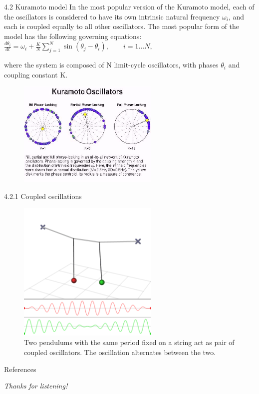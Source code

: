 \documentclass[
  notheorems,
  aspectratio=54,
]{beamer}
\begin{document}
\begin{frame}{4.2 Kuramoto model}
  In the most popular version of the Kuramoto model, each of the oscillators is considered to have its own intrinsic natural frequency
  $\omega _{i}$, and each is coupled equally to all other oscillators.
  The most popular form of the model has the following governing equations:
  \\\centering ${\frac  {d\theta _{i}}{dt}}=\omega _{i}+{\frac  {K}{N}}\sum _{{j=1}}^{{N}}\sin(\theta _{j}-\theta _{i}),\qquad i=1\ldots N$,
  \\\raggedright where the system is composed of N limit-cycle oscillators, with phases ${\displaystyle \theta _{i}}$ and coupling constant K.
  \begin{figure}
    \centering
    \includegraphics[width=0.6\textwidth]{kuramoto_oscilators.jpg}
  \end{figure}
\end{frame}

\begin{frame}{4.2.1 Coupled oscillations}
  \begin{figure}
    \centering
    \includegraphics[width=0.6\textwidth]{Coupled_oscillators.png}
    \caption{Two pendulums with the same period fixed on a string act as pair of coupled oscillators. The oscillation alternates between the two.}
  \end{figure}
\end{frame}

\begin{frame}{References}
    \printbibliography
\end{frame}

\begin{frame}{}
  \centering \Huge
  \emph{Thanks for listening!}
\end{frame}
\end{document}
